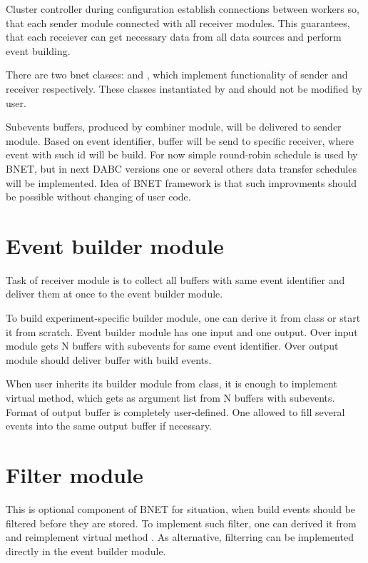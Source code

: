 Cluster controller during configuration establish connections between workers so,
that each sender module connected with all receiver modules. This guarantees, that 
each receiever can get necessary data from all data sources and perform event building.

There are two bnet classes:  and ,
which implement functionality of sender and receiver respectively. 
These classes instantiated by
 and should not be modified by user.     

Subevents buffers, produced by combiner module, will be delivered 
to sender module. Based on event identifier, buffer will be 
send to specific receiver, where event with such id will be build. 
For now simple round-robin schedule is used by BNET, but in next DABC versions
one or several others data transfer schedules will be implemented.
Idea of BNET framework is that such improvments should be possible without
changing of user code.  


\section{Event builder module}

Task of receiver module is to collect all buffers with same event identifier and
deliver them at once to the event builder module.

To build experiment-specific builder module, one can derive it from
 class or start it from scratch. 
Event builder module has one input and one output. Over input module gets
N buffers with subevents for same event identifier. Over output module should deliver
buffer with build events. 
 
When user inherits its builder module from  class,
it is enough to implement virtual  method, 
which gets as argument list from N buffers with subevents. 
Format of output buffer is completely user-defined. 
One allowed to fill several events into the same output buffer if necessary.    


\section{Filter module}

This is optional component of BNET for situation, when build events should be filtered
before they are stored. To implement such filter, 
one can derived it from  and reimplement virtual method
. As alternative, filterring can be implemented directly in the 
event builder module.  


